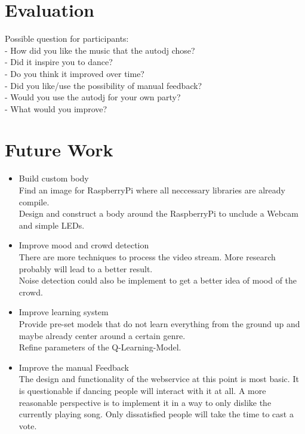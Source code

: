 \documentclass{article}
\begin{document}
\section{Evaluation}


Possible question for participants:\\
- How did you like the music that the autodj chose?\\
- Did it inspire you to dance?\\
- Do you think it improved over time?\\
- Did you like/use the possibility of manual feedback?\\
- Would you use the autodj for your own party?\\
- What would you improve?


\section{Future Work}


\begin{itemize}
    \item Build custom body\\
        Find an image for RaspberryPi where all neccessary libraries are already compile. \\
        Design and construct a body around the RaspberryPi to unclude a Webcam and simple LEDs.
    
    \item Improve mood and crowd detection\\
        There are more techniques to process the video stream. More research probably will lead to a better result.\\
        Noise detection could also be implement to get a better idea of mood of the crowd.
    
    \item Improve learning system \\
        Provide pre-set models that do not learn everything from the ground up and maybe already center around a certain genre.\\
        Refine parameters of the Q-Learning-Model.
    
    \item Improve the manual Feedback\\
        The design and functionality of the webservice at this point is most basic. It is questionable if dancing people will interact with it at all. A more reasonable perspective is to implement it in a way to only dislike the currently playing song. Only dissatisfied people will take the time to cast a vote. 
\end{itemize}






\end{document}
